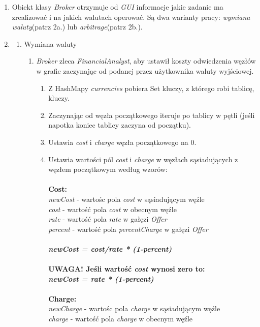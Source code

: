 \documentclass[a4paper,11pt]{article}
\begin{document}
\begin{enumerate}

\item Obiekt klasy \textit{Broker} otrzymuje od \textit{GUI} informacje jakie zadanie ma zrealizować i na jakich walutach operować. Są dwa warianty pracy: \textit{wymiana waluty}(patrz 2a.) lub \textit{arbitrage}(patrz 2b.).
\item
\begin{enumerate}
\item Wymiana waluty

\begin{enumerate}
\item \textit{Broker} zleca \textit{FinancialAnalyst}, aby ustawił koszty odwiedzenia węzłów w grafie zaczynając od podanej przez użytkownika waluty wyjściowej.
\begin{enumerate}
\item Z HashMapy \textit{currencies} pobiera Set kluczy, z którego robi tablicę, kluczy.
\item Zaczynając od węzła początkowego iteruje po tablicy w pętli (jeśli napotka koniec tablicy zaczyna od początku).
\item Ustawia \textit{cost} i \textit{charge} węzła początkowego na 0.
\item Ustawia wartości pól \textit{cost} i \textit{charge} w węzłach sąsiadujących z węzłem początkowym według wzorów:
\\
\\\textbf{Cost:}
\\\textit{newCost} - wartośc pola \textit{cost} w sąsiadującym węźle
\\ \textit{cost} - wartość pola \textit{cost} w obecnym węźle
\\ \textit{rate} - wartość pola \textit{rate} w gałęzi \textit{Offer}
\\ \textit{percent} - wartość pola \textit{percentCharge} w gałęzi \textit{Offer}
\\
\\ \textbf{\emph{newCost = cost/rate * (1-percent)}}
\\
\textbf{\\ UWAGA! Jeśli wartość \textit{cost} wynosi zero to:}
\\ \textbf{\emph{newCost = rate * (1-percent)}}
\\
\\\textbf{Charge:}
\\\textit{newCharge} - wartośc pola \textit{charge} w sąsiadującym węźle
\\ \textit{charge} - wartość pola \textit{charge} w obecnym węźle

\end{enumerate}
\end{enumerate}
\end{enumerate}
\end{enumerate}
\end{document}
